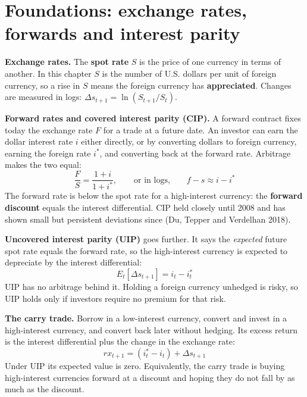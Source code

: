 \section{Foundations: exchange rates, forwards and interest parity}
\label{sec:18-foundations}

\textbf{Exchange rates.} The \textbf{spot rate} $S$ is the price of one currency in terms of another. In this chapter $S$ is the number of U.S. dollars per unit of foreign currency, so a rise in $S$ means the foreign currency has \textbf{appreciated}. Changes are measured in logs: $\Delta s_{t+1} = \ln(S_{t+1}/S_t)$.

\textbf{Forward rates and covered interest parity (CIP).} A forward contract fixes today the exchange rate $F$ for a trade at a future date. An investor can earn the dollar interest rate $i$ either directly, or by converting dollars to foreign currency, earning the foreign rate $i^*$, and converting back at the forward rate. Arbitrage makes the two equal:
\begin{equation}
  \frac{F}{S} = \frac{1 + i}{1 + i^*}, \qquad \text{or in logs,} \qquad f - s \approx i - i^*
  \label{eq:18-cip}
\end{equation}
The forward rate is below the spot rate for a high-interest currency: the \textbf{forward discount} equals the interest differential. CIP held closely until 2008 and has shown small but persistent deviations since (Du, Tepper and Verdelhan 2018).

\textbf{Uncovered interest parity (UIP)} goes further. It says the \emph{expected} future spot rate equals the forward rate, so the high-interest currency is expected to depreciate by the interest differential:
\begin{equation}
  E_t[\Delta s_{t+1}] = i_t - i^*_t
  \label{eq:18-uip}
\end{equation}
UIP has no arbitrage behind it. Holding a foreign currency unhedged is risky, so UIP holds only if investors require no premium for that risk.

\textbf{The carry trade.} Borrow in a low-interest currency, convert and invest in a high-interest currency, and convert back later without hedging. Its excess return is the interest differential plus the change in the exchange rate:
\begin{equation}
  rx_{t+1} = (i^*_t - i_t) + \Delta s_{t+1}
  \label{eq:18-carry}
\end{equation}
Under UIP its expected value is zero. Equivalently, the carry trade is buying high-interest currencies forward at a discount and hoping they do not fall by as much as the discount.

